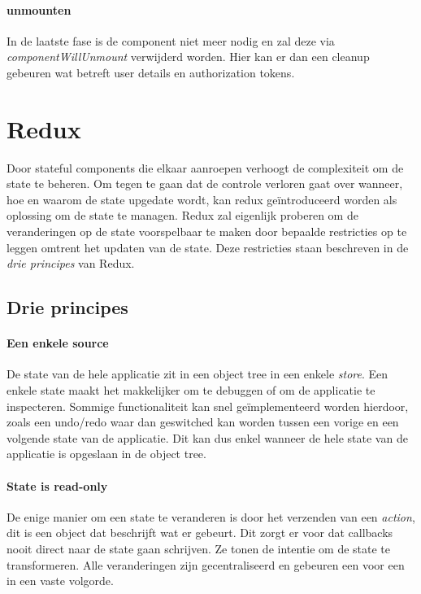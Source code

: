\paragraph{unmounten}
In de laatste fase is de component niet meer nodig en zal deze via \textit{componentWillUnmount} verwijderd worden. Hier kan er dan een cleanup gebeuren wat betreft user details en authorization tokens.

\section{Redux}
Door stateful components die elkaar aanroepen verhoogt de complexiteit om de state te beheren. Om tegen te gaan dat de controle verloren gaat over wanneer, hoe en waarom de state upgedate wordt, kan redux geïntroduceerd worden als oplossing om de state te managen. Redux zal eigenlijk proberen om de veranderingen op de state voorspelbaar te maken door bepaalde restricties op te leggen omtrent het updaten van de state. Deze restricties staan beschreven in de \textit{drie principes} van Redux.

\subsection{Drie principes}

\paragraph{Een enkele source}  
De state van de hele applicatie zit in een object tree in een enkele \textit{store}. Een enkele state maakt het makkelijker om te debuggen of om de applicatie te inspecteren. Sommige functionaliteit kan snel geïmplementeerd worden hierdoor, zoals een undo/redo waar dan geswitched kan worden tussen een vorige en een volgende state van de applicatie. Dit kan dus enkel wanneer de hele state van de applicatie is opgeslaan in de object tree.

\paragraph{State is read-only}
De enige manier om een state te veranderen is door het verzenden van een \textit{action}, dit is een object dat beschrijft wat er gebeurt. Dit zorgt er voor dat callbacks nooit direct naar de state gaan schrijven. Ze tonen de intentie om de state te transformeren. Alle veranderingen zijn gecentraliseerd en gebeuren een voor een in een vaste volgorde.   

